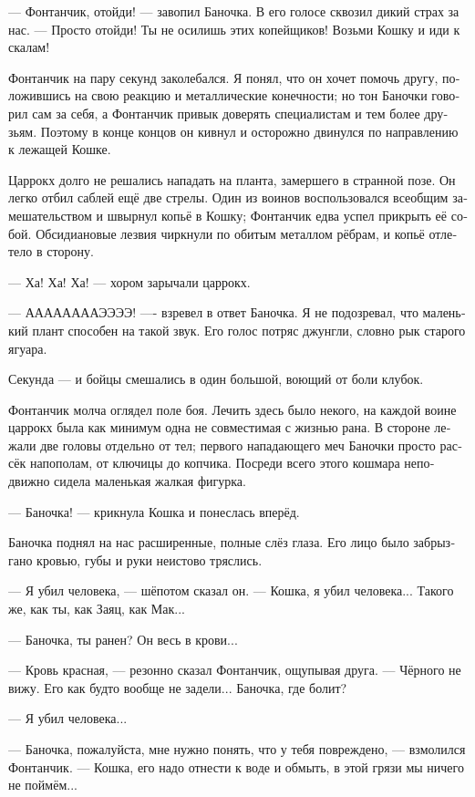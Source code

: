 \documentclass[a4paper,12pt,fleqn]{book}\usepackage{polyglossia}\setdefaultlanguage[babelshorthands=true]{russian}\setotherlanguage{english}\defaultfontfeatures{Ligatures=TeX,Mapping=tex-text}\usepackage{xcolor}\newcommand{\ml}[3]{#2}
\newcommand{\asterism}{\vspace{1em}{\centering\Large\bfseries$\ast~\ast~\ast$\par}\vspace{1em}}
\begin{document}
{--- Фонтанчик, отойди! --- завопил Баночка.
В его голосе сквозил дикий страх за нас.
--- Просто отойди!
Ты не осилишь этих копейщиков!
Возьми Кошку и иди к скалам!

Фонтанчик на пару секунд заколебался.
Я понял, что он хочет помочь другу, положившись на свою реакцию и металлические конечности;
но тон Баночки говорил сам за себя, а Фонтанчик привык доверять специалистам и тем более друзьям.
Поэтому в конце концов он кивнул и осторожно двинулся по направлению к лежащей Кошке.

Царрокх долго не решались нападать на планта, замершего в странной позе.
Он легко отбил саблей ещё две стрелы.
Один из воинов воспользовался всеобщим замешательством и швырнул копьё в Кошку;
Фонтанчик едва успел прикрыть её собой.
Обсидиановые лезвия чиркнули по обитым металлом рёбрам, и копьё отлетело в сторону.

--- Ха! Ха! Ха! --- хором зарычали царрокх.

--- ААААААААЭЭЭЭ! ---- взревел в ответ Баночка.
Я не подозревал, что маленький плант способен на такой звук.
Его голос потряс джунгли, словно рык старого ягуара.

Секунда --- и бойцы смешались в один большой, воющий от боли клубок.

\asterism

Фонтанчик молча оглядел поле боя.
Лечить здесь было некого, на каждой воине царрокх была как минимум одна не совместимая с жизнью рана.
В стороне лежали две головы отдельно от тел;
первого нападающего меч Баночки просто рассёк напополам, от ключицы до копчика.
Посреди всего этого кошмара неподвижно сидела маленькая жалкая фигурка.

--- Баночка! --- крикнула Кошка и понеслась вперёд.

Баночка поднял на нас расширенные, полные слёз глаза.
Его лицо было забрызгано кровью, губы и руки неистово тряслись.

--- Я убил человека, --- шёпотом сказал он.
--- Кошка, я убил человека...
Такого же, как ты, как Заяц, как Мак...

--- Баночка, ты ранен?
Он весь в крови...

--- Кровь красная, --- резонно сказал Фонтанчик, ощупывая друга.
--- Чёрного не вижу.
Его как будто вообще не задели...
Баночка, где болит?

--- Я убил человека...

--- Баночка, пожалуйста, мне нужно понять, что у тебя повреждено, --- взмолился Фонтанчик.
--- Кошка, его надо отнести к воде и обмыть, в этой грязи мы ничего не поймём...

}
\end{document}

